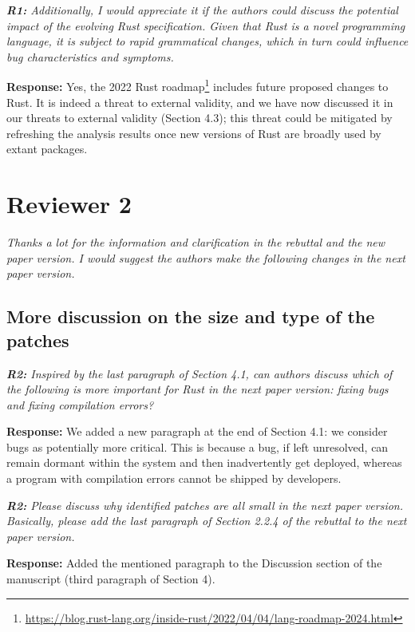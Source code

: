\documentclass{article}
\begin{document}
\textit{\textbf{R1:} Additionally, I would appreciate it if the authors could discuss the potential impact of the evolving Rust specification. Given that Rust is a novel programming language, it is subject to rapid grammatical changes, which in turn could influence bug characteristics and symptoms.}

\vspace*{1em} \noindent \textbf{Response:} Yes, the 2022 Rust roadmap\footnote{\url{https://blog.rust-lang.org/inside-rust/2022/04/04/lang-roadmap-2024.html}} includes future proposed changes to Rust. It is indeed a threat to external validity, and we have now discussed it in our threats to external validity (Section 4.3); this threat could be mitigated by refreshing the analysis results once new versions of Rust are broadly used by extant packages.

\section{Reviewer 2}

\textit{Thanks a lot for the information and clarification in the rebuttal and the new paper version. I would suggest the authors make the following changes in the next paper version.}

\subsection{More discussion on the size and type of the patches}

\textit{\textbf{R2:} Inspired by the last paragraph of Section 4.1, can authors discuss which of the following is more important for Rust in the next paper version: fixing bugs and fixing compilation errors?}

\vspace*{1em} \noindent \textbf{Response:} We added a new paragraph at the end of Section 4.1: we consider bugs as potentially more critical. This is because a bug, if left unresolved, can remain dormant within the system and then inadvertently get deployed, whereas a program with compilation errors cannot be shipped by developers.

\vspace*{1em} \noindent \textit{\textbf{R2:} Please discuss why identified patches are all small in the next paper version. Basically, please add the last paragraph of Section 2.2.4 of the rebuttal to the next paper version.}

\vspace*{1em} \noindent \textbf{Response:} Added the mentioned paragraph to the Discussion section of the manuscript (third paragraph of Section 4).
\end{document}
